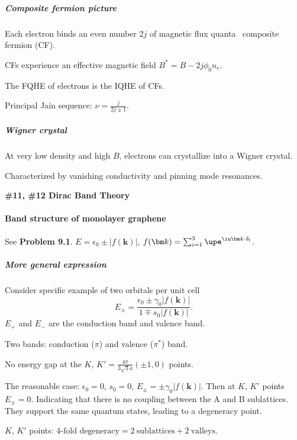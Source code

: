 \subparagraph{Composite fermion picture}

\begin{enumext}
  \item Each electron binds an even number $2j$ of magnetic flux quanta
  \textrightarrow\ composite fermion (CF).
  \item CFs experience an effective magnetic field $B^* = B - 2j \phi_0 n_e$.
  \item The FQHE of electrons is the IQHE of CFs.
  \item Principal Jain sequence: $\nu = \frac{j}{2j \pm 1}$.
\end{enumext}

\subparagraph{Wigner crystal}

\begin{enumext}
  \item At very low density and high $B$, electrons can crystallize into a
  Wigner crystal.
  \item Characterized by vanishing conductivity and pinning mode resonances.
\end{enumext}

\begin{framed}\large\bfseries
  \#11, \#12 Dirac Band Theory
\end{framed}

\paragraph{Band structure of monolayer graphene}\leavevmode

See \textbf{Problem 9.1}. $E = \epsilon_0 \pm |f(\bm k)|$,
$f(\bm k) = \sum_{i=1}^3 \upe^{\iu\bm k \cdot \delta_l}$.

\subparagraph{More general expression}

Consider specific example of two orbitals per unit cell
\[
  E_\pm = \frac{\epsilon_0 \pm \gamma_0|f(\bm k)|}{1 \mp s_0|f(\bm k)|}.
\]
$E_+$ and $E_-$ are the conduction band and valence band.
\begin{enumext}
  \item Two bands: conduction ($\pi$) and valence ($\pi^*$) band.
  \item No energy gap at the $K$, $K' = \frac{4\pi}{3\sqrt3a}(\pm1,0)$ points.
  \item The reasonable case: $\epsilon_0 = 0$, $s_0 = 0$,
  $E_\pm = \pm\gamma_0|f(\bm k)|$. Then at $K$, $K'$ points $E_\pm = 0$.
  Indicating that there is no coupling between the A and B sublattices.
  They support the same quantum states, leading to a degeneracy point.
  \item $K$, $K'$ points:
  $4\text{-fold degeneracy} = 2\ \text{sublattices} + 2\ \text{valleys}$.
\end{enumext}

